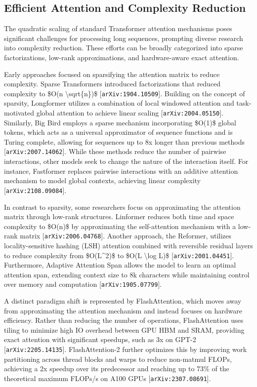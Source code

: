 \documentclass[11pt]{article}
\begin{document}
\subsection{Efficient Attention and Complexity Reduction}

The quadratic scaling of standard Transformer attention mechanisms poses significant challenges for processing long sequences, prompting diverse research into complexity reduction. These efforts can be broadly categorized into sparse factorizations, low-rank approximations, and hardware-aware exact attention.

Early approaches focused on sparsifying the attention matrix to reduce complexity. Sparse Transformers introduced factorizations that reduced complexity to \$O(n \textbackslash{}sqrt\{n\})\$ [\texttt{arXiv:1904.10509}]. Building on the concept of sparsity, Longformer utilizes a combination of local windowed attention and task-motivated global attention to achieve linear scaling [\texttt{arXiv:2004.05150}]. Similarly, Big Bird employs a sparse mechanism incorporating \$O(1)\$ global tokens, which acts as a universal approximator of sequence functions and is Turing complete, allowing for sequences up to 8x longer than previous methods [\texttt{arXiv:2007.14062}]. While these methods reduce the number of pairwise interactions, other models seek to change the nature of the interaction itself. For instance, Fastformer replaces pairwise interactions with an additive attention mechanism to model global contexts, achieving linear complexity [\texttt{arXiv:2108.09084}].

In contrast to sparsity, some researchers focus on approximating the attention matrix through low-rank structures. Linformer reduces both time and space complexity to \$O(n)\$ by approximating the self-attention mechanism with a low-rank matrix [\texttt{arXiv:2006.04768}]. Another approach, the Reformer, utilizes locality-sensitive hashing (LSH) attention combined with reversible residual layers to reduce complexity from \$O(L\textasciicircum{}2)\$ to \$O(L \textbackslash{}log L)\$ [\texttt{arXiv:2001.04451}]. Furthermore, Adaptive Attention Span allows the model to learn an optimal attention span, extending context size to 8k characters while maintaining control over memory and computation [\texttt{arXiv:1905.07799}].

A distinct paradigm shift is represented by FlashAttention, which moves away from approximating the attention mechanism and instead focuses on hardware efficiency. Rather than reducing the number of operations, FlashAttention uses tiling to minimize high IO overhead between GPU HBM and SRAM, providing exact attention with significant speedups, such as 3x on GPT-2 [\texttt{arXiv:2205.14135}]. FlashAttention-2 further optimizes this by improving work partitioning across thread blocks and warps to reduce non-matmul FLOPs, achieving a 2x speedup over its predecessor and reaching up to 73\% of the theoretical maximum FLOPs/s on A100 GPUs [\texttt{arXiv:2307.08691}].
\end{document}
